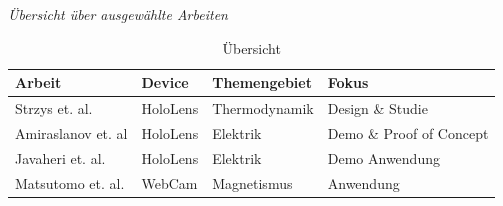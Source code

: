 \vspace{4px}
\textit{Übersicht über ausgewählte Arbeiten}\\
\setlength\extrarowheight{2pt}
\begin{table}[htb]
	\centering
	\begin{tabular}{l|l|l|l}
		Arbeit & Device & Themengebiet & Fokus\\
		\hline
		\hline
		Strzys et. al. & HoloLens & Thermodynamik & Design \& Studie\\
		\hline
		Amiraslanov et. al & HoloLens & Elektrik & Demo \& Proof of Concept\\
		\hline
		Javaheri et. al. & HoloLens & Elektrik & Demo Anwendung\\
		\hline
		Matsutomo et. al. & WebCam & Magnetismus & Anwendung\\
	\end{tabular}\caption{\label{tab:comparioson} Übersicht}
\end{table}


